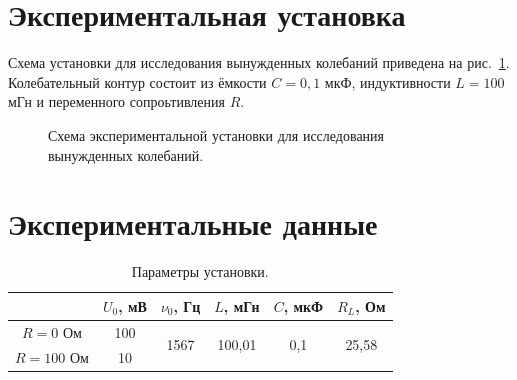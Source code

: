 \documentclass[a4paper,12pt]{article} %
\begin{document}
\section{Экспериментальная установка}
	Схема установки для исследования вынужденных колебаний приведена на рис.~\ref{ris:ustanovka}. Колебательный контур состоит из ёмкости $C = 0,1$ мкФ, индуктивности $L = 100$ мГн и переменного сопроьтивления $R$.	
	\begin{figure}[H]
		\caption{Схема экспериментальной установки для исследования вынужденных колебаний.}
		\label{ris:ustanovka}
	\end{figure}

\newpage
\section{Экспериментальные данные}
	\begin{table}[H]
		\caption{Параметры установки.}
		\label{table:const}
		\begin{tabular}{|c|c|c|c|c|c|}
			\hline
			& $U_0$, мВ & $\nu_0$, Гц           & $L$, мГн                & $C$, мкФ             & $R_L$, Ом              \\ \hline
			$R = 0$ Ом   & 100       & \multirow{2}{*}{1567} & \multirow{2}{*}{100,01} & \multirow{2}{*}{0,1} & \multirow{2}{*}{25,58} \\ \cline{1-2}
			$R = 100$ Ом & 10        &                       &                         &                      &                        \\ \hline
		\end{tabular}
	\end{table}
\end{document}
